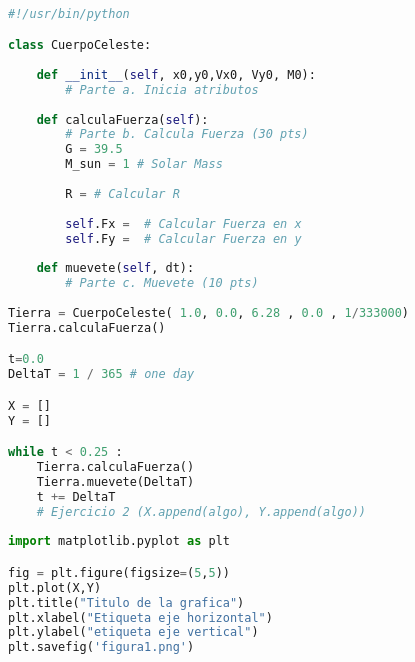 \documentclass{article}
\begin{document}
\begin{lstlisting}[language=Python, caption=Estructura del ejercicio 2.]

#!/usr/bin/python

class CuerpoCeleste:
    
    def __init__(self, x0,y0,Vx0, Vy0, M0):
        # Parte a. Inicia atributos
        
    def calculaFuerza(self):
        # Parte b. Calcula Fuerza (30 pts)
        G = 39.5
        M_sun = 1 # Solar Mass
        
        R = # Calcular R
        
        self.Fx =  # Calcular Fuerza en x
        self.Fy =  # Calcular Fuerza en y
            
    def muevete(self, dt):
        # Parte c. Muevete (10 pts)
        
Tierra = CuerpoCeleste( 1.0, 0.0, 6.28 , 0.0 , 1/333000)
Tierra.calculaFuerza()

t=0.0
DeltaT = 1 / 365 # one day

X = []
Y = []

while t < 0.25 :
    Tierra.calculaFuerza()
    Tierra.muevete(DeltaT)
    t += DeltaT
    # Ejercicio 2 (X.append(algo), Y.append(algo))
    
import matplotlib.pyplot as plt

fig = plt.figure(figsize=(5,5))
plt.plot(X,Y)
plt.title("Titulo de la grafica")
plt.xlabel("Etiqueta eje horizontal")
plt.ylabel("etiqueta eje vertical")
plt.savefig('figura1.png')
\end{lstlisting}
\end{document}
